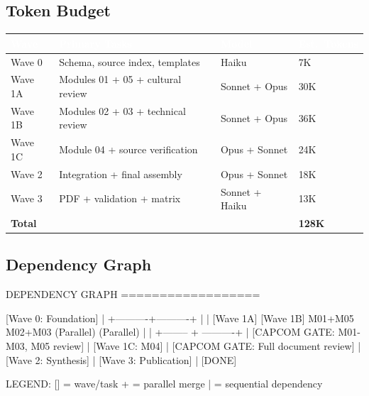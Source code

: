 \documentclass[11pt,letterpaper]{article}
\newcommand{\tableheader}[1]{\textbf{\sffamily\textcolor{white}{#1}}}
\begin{document}
\subsection{Token Budget}

\begin{center}
\begin{tabularx}{\textwidth}{L{3.5cm}XC{2cm}C{2cm}}
\toprule
{}
\tableheader{Wave} & \tableheader{Primary Tasks} & \tableheader{Model} & \tableheader{Est.\ Tokens} \\
\midrule
Wave 0 & Schema, source index, templates & Haiku & 7K \\
Wave 1A & Modules 01 + 05 + cultural review & Sonnet + Opus & 30K \\
Wave 1B & Modules 02 + 03 + technical review & Sonnet + Opus & 36K \\
Wave 1C & Module 04 + source verification & Opus + Sonnet & 24K \\
Wave 2 & Integration + final assembly & Opus + Sonnet & 18K \\
Wave 3 & PDF + validation + matrix & Sonnet + Haiku & 13K \\
\midrule
{}
\textbf{Total} & & & \textbf{128K} \\
\bottomrule
\end{tabularx}
\end{center}

\subsection{Dependency Graph}

\begin{asciibox}
DEPENDENCY GRAPH
==================

  [Wave 0: Foundation]
       |
       +----------+----------+
       |                     |
  [Wave 1A]            [Wave 1B]
  M01+M05               M02+M03
  (Parallel)            (Parallel)
       |                     |
       +-------- + ----------+
                 |
         [CAPCOM GATE: M01-M03, M05 review]
                 |
           [Wave 1C: M04]
                 |
         [CAPCOM GATE: Full document review]
                 |
           [Wave 2: Synthesis]
                 |
           [Wave 3: Publication]
                 |
              [DONE]

LEGEND: [] = wave/task   + = parallel merge   | = sequential dependency
\end{asciibox}
\end{document}
